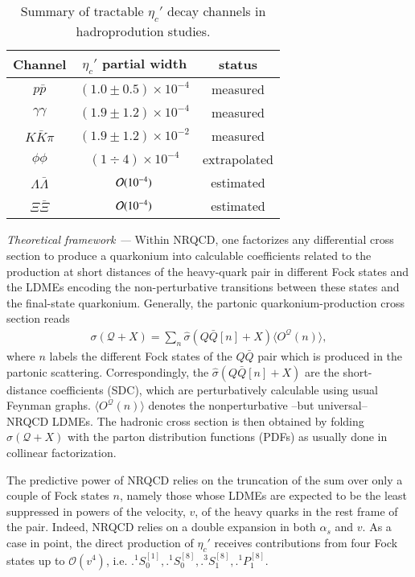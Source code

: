 \documentclass[showpacs,aps,PRL,twocolumn,footinbib,11]{revtex4-1}
\def\oSzo{{\bigl.^1\!S^{[1]}_0}}
\def\oSze{{\bigl.^1\!S^{[8]}_0}}
\def\tSoe{{\bigl.^3\!S^{[8]}_1}}
\def\oPoe{{\bigl.^1\!P^{[8]}_1}}
\def\etacp{\eta_c'}
\newcommand{\eqs}[1]{\begin{equation} \begin{split} #1\end{split} \end{equation} }
\newcommand{\red}[1]{\textcolor[rgb]{1,0,0}{#1}}
\begin{document}
\begin{table}[hbt!]
\begin{tabular}{c|c|c}
Channel & $\etacp$ partial width & status \\
\hline
$p \bar p$ & $(1.0\pm 0.5) \times 10^{-4}$ & measured \\ 
$\gamma \gamma$ & $(1.9 \pm 1.2) \times 10^{-4}$ & measured  \\
$K \bar K \pi$ & $(1.9 \pm 1.2) \times 10^{-2}$ & measured\\
$\phi \phi$ & $(1 \div 4) \times 10^{-4}$ & extrapolated  \\

$\Lambda \bar \Lambda$ & ${\cal O}(10^{-4})$ & estimated \\
$\Xi  \bar \Xi$ & ${\cal O}(10^{-4})$ & estimated \\
\end{tabular}
\caption{Summary of tractable $\etacp$ decay channels in hadroprodution studies.}
\label{tab:etacp_branching} 
\end{table}

\textit{Theoretical framework ---} 
Within NRQCD, one factorizes any differential cross section to produce a 
quarkonium into calculable coefficients related to the production at short distances of
the heavy-quark pair in different Fock states and
the LDMEs encoding the non-perturbative transitions between these states and the final-state 
quarkonium. Generally, the partonic quarkonium-production cross section reads
\eqs{
\sigma(\mathcal{Q}+X)=\sum_{n}{\hat{\sigma}(Q\bar{Q}[n]+X)\langle O^{\mathcal{Q}}(n)\rangle},
\label{eq:NRQCD}}
where $n$ labels the different Fock states of the $Q\bar{Q}$ pair which is produced in the partonic
scattering. Correspondingly, the $\hat{\sigma}(Q\bar{Q}[n]+X)$ are the short-distance coefficients (SDC),
which are perturbatively calculable using usual Feynman graphs.  %
$\langle O^{\mathcal{Q}}(n)\rangle$ denotes the nonperturbative --but universal-- NRQCD LDMEs. 
The hadronic cross section is then obtained by folding $\sigma(\mathcal{Q}+X)$ with the parton distribution functions (PDFs) as usually done in collinear factorization.

The predictive power of NRQCD relies on the truncation of the sum over only a couple of Fock states $n$, 
namely those whose LDMEs are expected to be the least suppressed in powers of the velocity, $v$,
of the heavy quarks in the rest frame of the pair. Indeed, NRQCD relies on a double expansion
in both $\alpha_s$ and $v$. As a case in point, the direct production of $\etacp$ receives contributions from four Fock states up to $\mathcal{O}(v^4)$, i.e. $\oSzo,\oSze,\tSoe,\oPoe$. 
\end{document}
